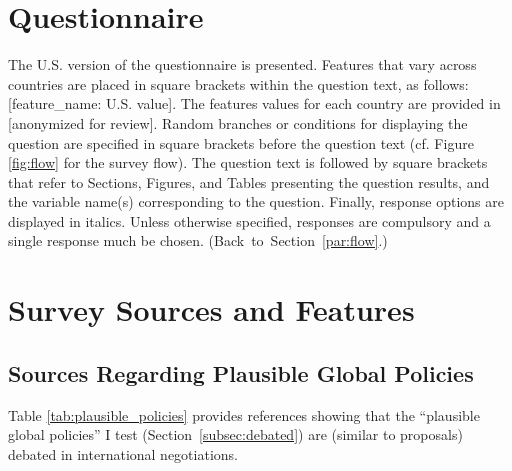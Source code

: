 \section{Questionnaire}\label{app:questionnaire}
The U.S. version of the questionnaire is presented. Features that vary across countries are placed in square brackets within the question text, as follows: [feature\_name: U.S. value]. The features values for each country are provided in [anonymized for review]. %
Random branches or conditions for displaying the question are specified in square brackets before the question text (cf. Figure \ref{fig:flow} for the survey flow). The question text is followed by square brackets that refer to Sections, Figures, and Tables presenting the question results, and the variable name(s) corresponding to the question. Finally, response options are displayed in italics. 
Unless otherwise specified, responses are compulsory and a single response much be chosen. \hfill (Back~to~Section~\ref{par:flow}.)



\clearpage
\section{Survey Sources and Features}\label{app:features}

\subsection{Sources Regarding Plausible Global Policies}\label{subsec:plausible_policies_sources}

Table \ref{tab:plausible_policies} provides references showing that the ``plausible global policies'' I test (Section~\ref{subsec:debated}) are (similar to proposals) debated in international negotiations.

